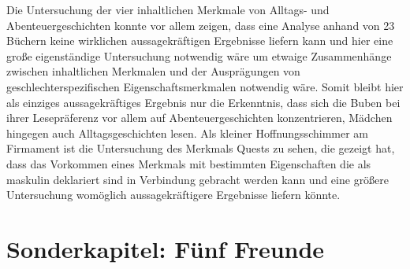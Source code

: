 Die Untersuchung der vier inhaltlichen Merkmale von Alltags- und
Abenteuergeschichten konnte vor allem zeigen, dass eine Analyse anhand
von 23 Büchern keine wirklichen aussagekräftigen Ergebnisse liefern kann
und hier eine große eigenständige Untersuchung notwendig wäre um etwaige
Zusammenhänge zwischen inhaltlichen Merkmalen und der Ausprägungen von
geschlechterspezifischen Eigenschaftsmerkmalen notwendig wäre. Somit
bleibt hier als einziges aussagekräftiges Ergebnis nur die Erkenntnis,
dass sich die Buben bei ihrer Lesepräferenz vor allem auf
Abenteuergeschichten konzentrieren, Mädchen hingegen auch
Alltagsgeschichten lesen. Als kleiner Hoffnungsschimmer am Firmament ist
die Untersuchung des Merkmals Quests zu sehen, die gezeigt hat, dass das
Vorkommen eines Merkmals mit bestimmten Eigenschaften die als maskulin
deklariert sind in Verbindung gebracht werden kann und eine größere
Untersuchung womöglich aussagekräftigere Ergebnisse liefern könnte.

\section{Sonderkapitel: Fünf Freunde}

